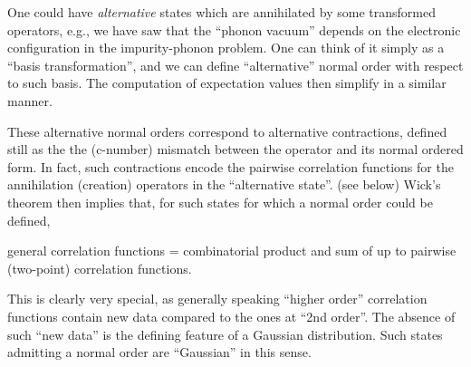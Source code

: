 One could have \emph{alternative} states which are annihilated by some transformed operators, e.g., we have saw that the ``phonon vacuum'' depends on the electronic configuration in the impurity-phonon problem. One can think of it simply as a ``basis transformation'', and we can define ``alternative'' normal order with respect to such basis. The computation of expectation values then simplify in a similar manner.

These alternative normal orders correspond to alternative contractions, defined still as the the (c-number) mismatch between the operator and its normal ordered form. In fact, such contractions encode the pairwise correlation functions for the annihilation (creation) operators in the ``alternative state''. (see below) Wick's theorem then implies that, for such states for which a normal order could be defined,

\begin{displayquote}
    general correlation functions = combinatorial product and sum of up to pairwise (two-point) correlation functions.
\end{displayquote}

\noindent This is clearly very special, as generally speaking ``higher order'' correlation functions contain new data compared to the ones at ``2nd order''. The absence of such ``new data'' is the defining feature of a Gaussian distribution. Such states admitting a normal order are ``Gaussian'' in this sense.

